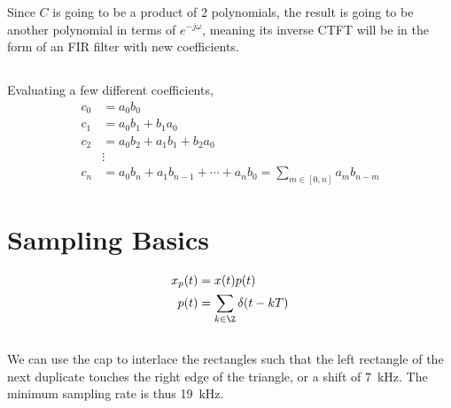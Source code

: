 \documentclass{article}
\begin{document}
\subsubsection{}

Since \(C\) is going to be a product of 2 polynomials, the result is going to be another polynomial in terms of \(e^{-j \omega}\), meaning its inverse CTFT will be in the form of an FIR filter with new coefficients.

\subsection{}

Evaluating a few different coefficients,
\begin{align}
    c_0 &= a_0 b_0 \\
    c_1 &= a_0 b_1 + b_1 a_0 \\
    c_2 &= a_0 b_2 + a_1 b_1 + b_2 a_0 \\
    &\vdots \\
    c_n &= a_0 b_n + a_1 b_{n - 1} + \cdots + a_n b_0 = \sum_{m \in [0, n]} a_m b_{n - m}
\end{align}

\section{Sampling Basics}

\begin{align}
    x_p(t) &= x(t) p(t) \\
    p(t) &= \sum_{k \in \Z} \delta(t - kT)
\end{align}

\subsection{}

We can use the cap to interlace the rectangles such that the left rectangle of the next duplicate touches the right edge of the triangle, or a shift of \SI{7}{\kilo\hertz}.
The minimum sampling rate is thus \SI{19}{\kilo\hertz}.

\subsection{}
\end{document}
